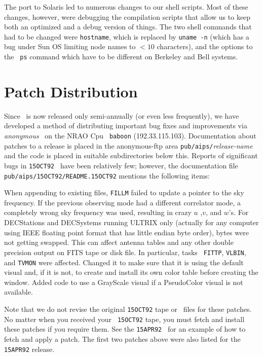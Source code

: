 The port to Solaris led to numerous changes to our shell scripts.
Most of these changes, however, were debugging the compilation scripts
that allow us to keep both an optimized and a debug version of things.
The two shell commands that had to be changed were {\tt hostname},
which is replaced by {\tt uname -n} (which has a bug under Sun OS
limiting node names to $< 10$ characters), and the options to the {\tt
ps} command which have to be different on Berkeley and Bell systems.


\section{Patch Distribution}

Since \AIPS\ is now released only semi-annually (or even less
frequently), we have developed a method of distributing important bug
fixes and improvements via {\it anonymous} \ftp\ on the NRAO Cpu {\tt
baboon} (192.33.115.103).  Documentation about patches to a release is
placed in the anonymous-ftp area {\tt pub/aips/}{\it release-name} and
the code is placed in suitable subdirectories below this.  Reports of
significant bugs in {\tt 15OCT92} \AIPS\ have been relatively few;
however, the documentation file {\tt pub/aips/15OCT92/README.15OCT92}
mentions the following items:
\begin{description}
 When appending to existing files, {\tt FILLM} failed to
    update a pointer to the sky frequency.  If the previous observing
    mode had a different correlator mode, a completely wrong sky
    frequency was used, resulting in crazy $u$ ,$v$, and $w$'s.
 For DECStations and DECSystems running ULTRIX only
    (actually for any computer using IEEE floating point format that
    has little endian byte order), bytes were not getting swapped.
    This can affect antenna tables and any other double precision
    output on FITS tape or disk file.  In particular, tasks {\tt
    FITTP}, {\tt VLBIN}, and {\tt TVMON} were affected.
  Changed it to make sure that it is using the default
    visual and, if it is not, to create and install its own color
    table before creating the window.  Added code to use a GrayScale
    visual if a PseudoColor visual is not available.
\end{description}
Note that we do not revise the original {\tt 15OCT92} tape or \tar\
files for these patches.  No matter when you received your {\tt
15OCT92} tape, you must fetch and install these patches if you require
them.  See the {\tt 15APR92} \AIPSLETTER\ for an example of how to
fetch and apply a patch.  The first two patches above were also listed
for the {\tt 15APR92} release.

